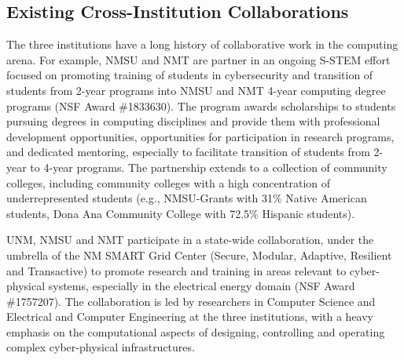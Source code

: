 \subsection{Existing Cross-Institution Collaborations}
The three institutions have a long history of collaborative work in the computing arena. For example, NMSU and NMT are partner in an ongoing S-STEM effort focused on promoting training of students in cybersecurity and transition of students from 2-year programs into NMSU and NMT 4-year computing degree programs (NSF Award \#1833630). The program awards scholarships to students pursuing degrees in computing disciplines and provide them with professional development opportunities, opportunities for participation in research programs, and dedicated mentoring, especially to facilitate transition of students from 2-year to 4-year programs. The partnership extends to a collection of community colleges, including community colleges with a high concentration of underrepresented students (e.g., NMSU-Grants with 31\% Native American students, Dona Ana Community College with 72.5\% Hispanic students).

UNM, NMSU and NMT participate in a state-wide collaboration, under the umbrella of the NM SMART Grid Center (Secure, Modular, Adaptive, Resilient and Transactive) to promote research and training in areas relevant to cyber-physical systems, especially in the electrical energy domain (NSF Award \#1757207). The collaboration is led by researchers in Computer Science and Electrical and Computer Engineering at the three institutions, with a heavy emphasis on the computational aspects of designing, controlling and operating complex cyber-physical infrastructures. 
